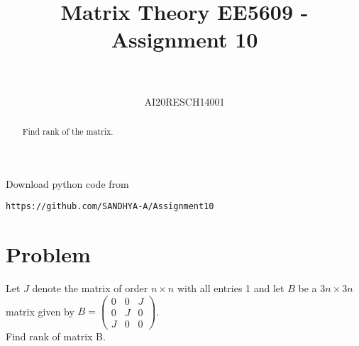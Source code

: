 \documentclass[journal,12pt,twocolumn]{IEEEtran}
\numberwithin{equation}{subsection}
\newcommand{\myvec}[1]{\ensuremath{\begin{pmatrix}#1\end{pmatrix}}}
\begin{document}
\title{Matrix Theory EE5609 - Assignment 10\\
}

\author{\\
 \\
AI20RESCH14001\\
 }

\maketitle
\begin{abstract}
Find rank of the matrix.
\end{abstract}
Download  python code from 
\begin{lstlisting}
https://github.com/SANDHYA-A/Assignment10
\end{lstlisting}
\section{Problem}
Let $J$ denote the matrix of order $n \times n$ with all
entries 1 and let $B$ be a $3n \times 3n$ matrix given by
$B = \myvec{0&0&J\\0&J&0\\J&0&0}$. \\
Find rank of matrix B.
\end{document}
